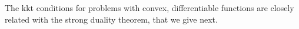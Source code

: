     

The \acrshort{kkt} conditions for problems with convex, differentiable functions are closely related with the strong duality theorem, that we give next.

